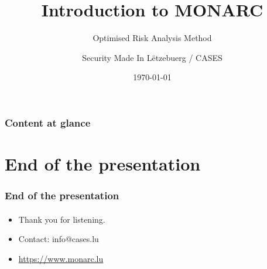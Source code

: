 \documentclass[]{beamer}
\title[Introduction to MONARC]{Introduction to MONARC}
\subtitle{Optimised Risk Analysis Method}
\author[Team CASES]{Security Made In Lëtzebuerg / CASES}
\institute[]{\href{https://www.cases.lu}{Cyberworld Awareness and Security Enhancements Services}}
\date{\today{}}
\begin{document}
\begin{frame}
    \titlepage
\end{frame}



\setcounter{tocdepth}{1}
\begin{frame}
    \frametitle{Content at glance}
    \tableofcontents
\end{frame}
\setcounter{tocdepth}{4}















%
%
\section*{End of the presentation}
\begin{frame}
    \frametitle{End of the presentation}
    \framesubtitle{}
    \begin{center}
        \begin{itemize}
            \item Thank you for listening.
            \item Contact: info@cases.lu
            \item \url{https://www.monarc.lu}
        \end{itemize}
    \end{center}
\end{frame}
\end{document}
